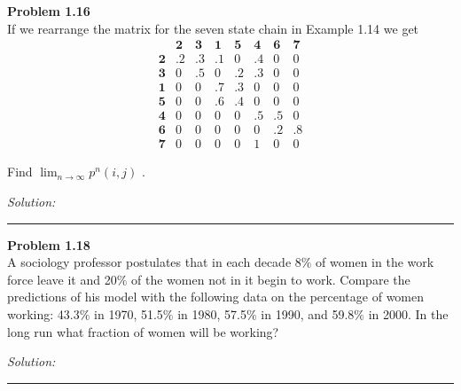 \documentclass[a4paper, 11pt]{article}
\newenvironment{problem}[2][Problem]
    { \begin{mdframed}[backgroundcolor=gray!20] \textbf{#1 #2} \\}
    {  \end{mdframed}}
\newenvironment{solution}
    {\textit{Solution:}}
    {}
\begin{document}
\begin{problem}{1.16}

If we rearrange the matrix for the seven state chain in Example 1.14 we
get
$$
\begin{array}{c|cc|cc|ccc} & \mathbf{2} & \mathbf{3} & \mathbf{1} & \mathbf{5} & \mathbf{4} & \mathbf{6} & \mathbf{7} \\ \hline \mathbf{2} & .2 & .3 & .1 & 0 & .4 & 0 & 0 \\ \mathbf{3} & 0 & .5 & 0 & .2 & .3 & 0 & 0 \\ \hline \mathbf{1} & 0 & 0 & .7 & .3 & 0 & 0 & 0 \\ \mathbf{5} & 0 & 0 & .6 & .4 & 0 & 0 & 0 \\ \hline \mathbf{4} & 0 & 0 & 0 & 0 & .5 & .5 & 0 \\ \mathbf{6} & 0 & 0 & 0 & 0 & 0 & .2 & .8 \\ \mathbf{7} & 0 & 0 & 0 & 0 & 1 & 0 & 0\end{array}
$$

Find $\lim_{n\rightarrow \infty}p^n(i,j)$ .




\end{problem}
\begin{solution}

\end{solution} 

\noindent\rule{7in}{2.8pt}

\begin{problem}{1.18}

A sociology professor postulates that in each decade 8$\%$ of women in the work force leave it and 20$\%$ of the women not in it begin to work. Compare the predictions of his model with the following data on the percentage of women working: 43.3$\%$ in 1970, 51.5$\%$ in 1980, 57.5$\%$ in 1990, and 59.8$\%$ in 2000. In the long run what fraction of women will be working?

\end{problem}
\begin{solution}

\end{solution} 

\noindent\rule{7in}{2.8pt}
\end{document}
